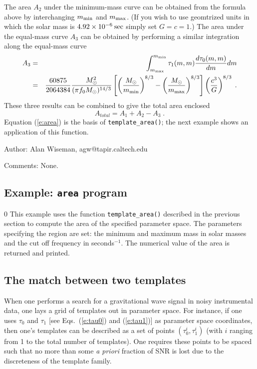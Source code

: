 The area $A_{2}$ under the minimum-mass curve can be obtained from the
formula above by interchanging $m_{\rm min}$ and $m_{\rm max}$.  (If you wish
to use geomtrized units in which the solar mass is $4.92\times10^{-6}
\> {\rm sec}$ simply set $G=c=1$.) The area under the equal-mass curve
$A_{3}$ can be obtained by performing a similar integration along the
equal-mass curve
\begin{eqnarray*}
A_{3} &=& \int_{m_{\rm max}}^{m_{\rm min}} 
\tau_1 (m,m) {d \tau_0(m,m) \over dm} dm\\
&=&{60875 \over 2064384} 
{  M_{\odot}^2  \over (\pi f_0 M_{\odot})^{14/3} } 
\left [ \left (  {M_{\odot}\over m_{\rm min}} \right )^{8/3}
- \left ( {M_{\odot}\over m_{\rm max}} \right )^{8/3} \right ]
\left ( {c^3 \over G } \right )^{8/3} \;.
\end{eqnarray*}
These three results can be combined to give the total area
enclosed
\begin{equation}
\label{e:area}
A_{total} = A_{1} + A_{2} - A_{3} \;.
\end{equation}
Equation (\ref{e:area}) is the basis of {\tt template\_area()}; the next
example shows an application of this function.
\begin{description}
\item{Author:}
Alan Wiseman, agw@tapir.caltech.edu
\item{Comments:}
None.
\end{description}
\clearpage

\subsection{Example: {\tt area} program}
\setcounter{equation}0
This example uses the function {\tt template\_area()} described in the
previous section to compute the area of the specified parameter space.
The parameters specifying the region  are set: the minimum and maximum
mass in solar masses and the cut off frequency in seconds$^{-1}$.  The
numerical value of the area is returned and printed.

\clearpage
\subsection{The match between two templates}
\par\noindent
\label{ss:match}
When one performs a search for a gravitational wave signal
in noisy instrumental data, one lays a grid of templates out
in parameter space.  For instance, if one uses $\tau_0$ and
$\tau_1$ [see Eqs.\ (\ref{e:tau0}) and (\ref{e:tau1})] as
parameter space coordinates, then one's templates can be
described as a set of points $(\tau_0^i,\tau_1^i)$ (with
$i$ ranging from 1 to the total number of templates).  One
requires these points to be spaced such that no more than some
{\it a priori}\/ fraction of SNR is lost due to the
discreteness of the template family.

